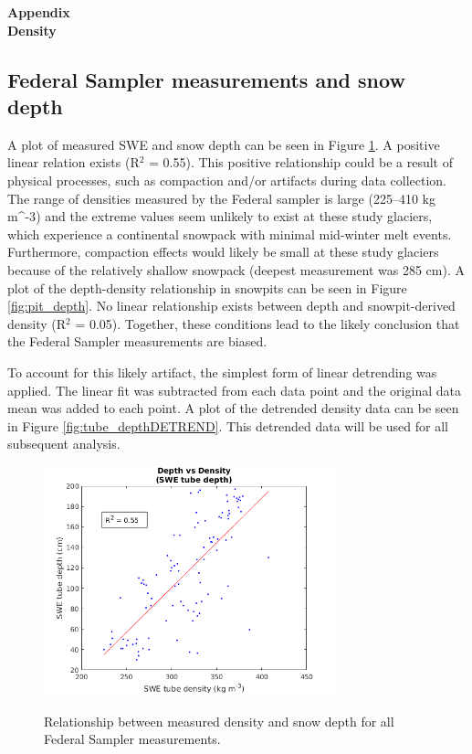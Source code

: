 \documentclass[12pt]{article}
\begin{document}

\begin{center}
\Large \textbf{Appendix\\ Density}
\end{center}

\subsection*{Federal Sampler measurements and snow depth}

A plot of measured SWE and snow depth can be seen in Figure \ref{fig:tube_depth}. A positive linear relation exists (R$^2$ = 0.55). This positive relationship could be a result of physical processes, such as compaction and/or artifacts during data collection. The range of densities measured by the Federal sampler is large (225--410 kg m^{-3}) and the extreme values seem unlikely to exist at these study glaciers, which experience a continental snowpack with minimal mid-winter melt events. Furthermore, compaction effects would likely be small at these study glaciers because of the relatively shallow snowpack (deepest measurement was 285 cm). A plot of the depth-density relationship in snowpits can be seen in Figure \ref{fig:pit_depth}. No linear relationship exists between depth and snowpit-derived density (R$^2$ = 0.05). Together, these conditions lead to the likely conclusion that the Federal Sampler measurements are biased. 

To account for this likely artifact, the simplest form of linear detrending was applied. The linear fit was subtracted from each data point and the original data mean was added to each point. A plot of the detrended density data can be seen in Figure \ref{fig:tube_depthDETREND}. This detrended data will be used for all subsequent analysis. 

\begin{figure} 
	\centering
	\includegraphics[width =0.75\textwidth]{DepthDensity_SWEtube.png}\\
	\caption{Relationship between measured density and snow depth for all Federal Sampler measurements.}
	\label{fig:tube_depth}
\end{figure}
\end{document}
